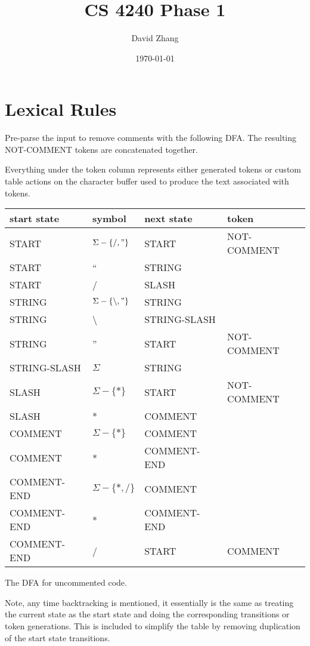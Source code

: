 \documentclass[11pt, fleqn]{article}
\begin{document}
\title{CS 4240 Phase 1}
\author{David Zhang}
\date{\today}

\newtheorem{Lemma}{Lemma}
\newtheorem{Theorem}{Theorem}
\maketitle

\section{Lexical Rules}

Pre-parse the input to remove comments with the following DFA. The resulting NOT-COMMENT tokens are concatenated together.

Everything under the token column represents either generated tokens or custom table actions on the character buffer used to produce the text associated with tokens.

\begin{tabular}{l|l|l|l}
start state		&	symbol							&	next	 state		&	token		 	\\
\hline
START			&	$\Sigma - \{/, "\}$				& 	START			&	NOT-COMMENT		\\
START			&	``								& 	STRING			&					\\
START			&	/								&	SLASH			&					\\
STRING			&	$\Sigma - \{\backslash, "\}$		& 	STRING			&					\\
STRING			&	\textbackslash					& 	STRING-SLASH		&					\\
STRING			&	''								& 	START			&	NOT-COMMENT		\\
STRING-SLASH		&	$\Sigma$							&	STRING			&					\\
SLASH			&	$\Sigma - \{*\}$					&	START			&	NOT-COMMENT		\\
SLASH			&	*								&	COMMENT			&					\\
COMMENT			&	$\Sigma - \{*\}$					&	COMMENT			&					\\
COMMENT			&	*								&	COMMENT-END		&					\\
COMMENT-END		&	$\Sigma - \{*, /\}$				&	COMMENT			&					\\
COMMENT-END		&	*								&	COMMENT-END		&					\\
COMMENT-END		&	/								&	START			&	COMMENT			\\
\end{tabular}

The DFA for uncommented code.

Note, any time backtracking is mentioned, it essentially is the same as treating the current state as the start state and doing the corresponding transitions or token generations. This is included to simplify the table by removing duplication of the start state transitions.
\end{document}
